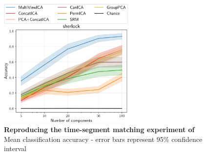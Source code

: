 \begin{figure}
  \centering
  \includegraphics[width=0.6\textwidth]{figures/mvica/timesegment_matching_cae.pdf}
  \caption{\textbf{Reproducing the time-segment matching experiment of \cite{chen2016convolutional}~\cite{zhang2016searchlight}} Mean classification accuracy - error bars represent 95\% confidence interval}
  \label{fig:supp_timesegment}
\end{figure}

